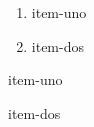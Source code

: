 \documentclass{article}
\begin{document}
\begin{description}[style=nextline]
\item[item-uno] \blindtext
\item[item-dos] \blindtext
\end{description}

\begin{enumerate}
\item{} {item-uno}
\item{} {item-dos}
\end{enumerate}

\begin{steps}
\item item-uno
\item item-dos
\end{steps}
\end{document}
